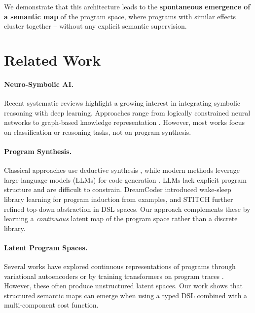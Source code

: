 \documentclass[final]{nesy2027}
\begin{document}
We demonstrate that this architecture leads to the \textbf{spontaneous emergence
of a semantic map} of the program space, where programs with similar effects
cluster together -- without any explicit semantic supervision.

\section{Related Work}
\label{sec:related}

\paragraph{Neuro-Symbolic AI.}
Recent systematic reviews \citep{colelough2025neurosymbolic} highlight a growing
interest in integrating symbolic reasoning with deep learning.
Approaches range from logically constrained neural networks
\citep{mao2019neuro} to graph-based knowledge representation
\citep{schlichtkrull2018modeling}.
However, most works focus on classification or reasoning tasks, not on program
synthesis.

\paragraph{Program Synthesis.}
Classical approaches use deductive synthesis \citep{gulwani2011automating},
while modern methods leverage large language models (LLMs) for code generation
\citep{chen2021evaluating}.
LLMs lack explicit program structure and are difficult to constrain.
DreamCoder \citep{ellis2021dreamcoder} introduced wake-sleep library learning
for program induction from examples, and STITCH \citep{bowers2023stitch} further
refined top-down abstraction in DSL spaces.
Our approach complements these by learning a \emph{continuous} latent map of the
program space rather than a discrete library.

\paragraph{Latent Program Spaces.}
Several works have explored continuous representations of programs through
variational autoencoders \citep{bunel2017learning} or by training transformers on
program traces \citep{zaremba2015learning}.
However, these often produce unstructured latent spaces.
Our work shows that structured semantic maps can emerge when using a typed DSL
combined with a multi-component cost function.
\end{document}
